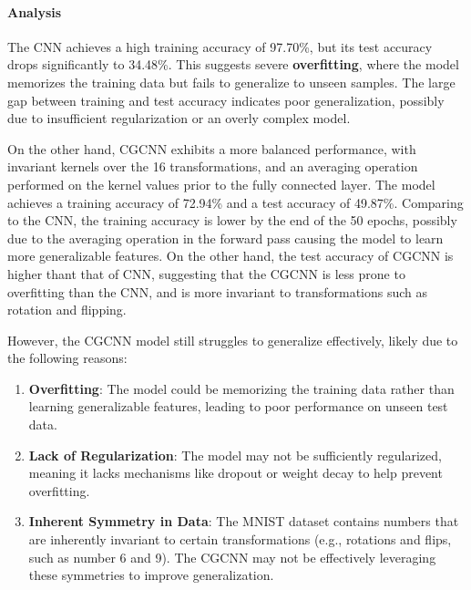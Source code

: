\begin{enumerate}
\paragraph{Analysis}

The CNN achieves a high training accuracy of 97.70\%, but its test accuracy
drops significantly to 34.48\%. This suggests severe \textbf{overfitting}, where
the model memorizes the training data but fails to generalize to unseen samples.
The large gap between training and test accuracy indicates poor generalization,
possibly due to insufficient regularization or an overly complex model.

On the other hand, CGCNN exhibits a more balanced performance, with invariant
kernels over the 16 transformations, and an averaging operation performed on the
kernel values prior to the fully connected layer. The model achieves a training
accuracy of 72.94\% and a test accuracy of 49.87\%. Comparing to the CNN, the
training accuracy is lower by the end of the 50 epochs, possibly due to the
averaging operation in the forward pass causing the model to learn more
generalizable features. On the other hand, the test accuracy of CGCNN is higher
thant that of CNN, suggesting that the CGCNN is less prone to overfitting than
the CNN, and is more invariant to transformations such as rotation and flipping.

However, the CGCNN model still struggles to generalize effectively, likely due
to the following reasons:

\begin{enumerate}
    \item \textbf{Overfitting}: The model could be memorizing the training data
    rather than learning generalizable features, leading to poor performance on
    unseen test data.
    \item \textbf{Lack of Regularization}: The model may not be sufficiently
    regularized, meaning it lacks mechanisms like dropout or weight decay to
    help prevent overfitting.
    \item \textbf{Inherent Symmetry in Data}: The MNIST dataset contains numbers
    that are inherently invariant to certain transformations (e.g., rotations
    and flips, such as number 6 and 9). The CGCNN may not be effectively
    leveraging these symmetries to improve generalization.
\end{enumerate}

\end{enumerate}
